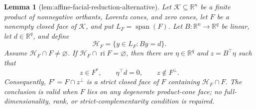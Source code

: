 \documentclass{article}
\newtheorem{lemma}{Lemma}
\begin{document}
\begin{lemma}[lem:affine-facial-reduction-alternative]\label{lem:affine-facial-reduction-alternative}
Let \(\mathcal K\subseteq\mathbb R^n\) be a finite product of nonnegative orthants, Lorentz cones, and zero cones, let \(F\) be a nonempty closed face of \(\mathcal K\), and put \(L_F=\operatorname{span}(F)\).  Let \(B:\mathbb R^n\to\mathbb R^q\) be linear, let \(d\in\mathbb R^q\), and define
\[
 \mathcal H_F=\{y\in L_F:By=d\}.
\]
Assume \(\mathcal H_F\cap F\ne\varnothing\).  If \(\mathcal H_F\cap\operatorname{ri}F=\varnothing\), then there are \(\eta\in\mathbb R^q\) and \(z=B^{\top}\eta\) such that
\[
 z\in F^*,\qquad \eta^{\top}d=0,
 \qquad z\notin F^\perp.
\]
Consequently, \(F'=F\cap z^\perp\) is a strict closed face of \(F\) containing \(\mathcal H_F\cap F\).  The conclusion is valid when \(F\) lies on any degenerate product-cone face; no full-dimensionality, rank, or strict-complementarity condition is required.
\end{lemma}
\end{document}
